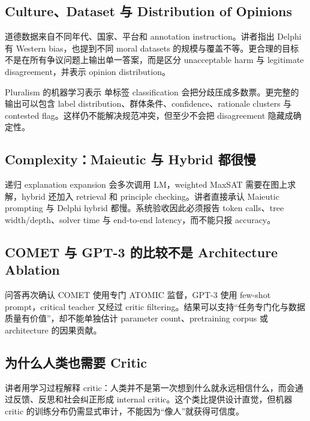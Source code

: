 \documentclass[a4paper]{article}
\begin{document}

\subsection{Culture、Dataset 与 Distribution of Opinions}

道德数据来自不同年代、国家、平台和 annotation instruction。讲者指出 Delphi 有 Western bias，也提到不同 moral datasets 的规模与覆盖不等。更合理的目标不是在所有争议问题上输出单一答案，而是区分 unacceptable harm 与 legitimate disagreement，并表示 opinion distribution。

\begin{knowledgebox}{Pluralism 的机器学习表示}
单标签 classification 会把分歧压成多数票。更完整的输出可以包含 label distribution、群体条件、confidence、rationale clusters 与 contested flag。这样仍不能解决规范冲突，但至少不会把 disagreement 隐藏成确定性。
\end{knowledgebox}

\subsection{Complexity：Maieutic 与 Hybrid 都很慢}

递归 explanation expansion 会多次调用 LM，weighted MaxSAT 需要在图上求解，hybrid 还加入 retrieval 和 principle checking。讲者直接承认 Maieutic prompting 与 Delphi hybrid 都慢。系统验收因此必须报告 token calls、tree width/depth、solver time 与 end-to-end latency，而不能只报 accuracy。

\subsection{COMET 与 GPT-3 的比较不是 Architecture Ablation}

问答再次确认 COMET 使用专门 ATOMIC 监督，GPT-3 使用 few-shot prompt，critical teacher 又经过 critic filtering。结果可以支持“任务专门化与数据质量有价值”，却不能单独估计 parameter count、pretraining corpus 或 architecture 的因果贡献。

\subsection{为什么人类也需要 Critic}

讲者用学习过程解释 critic：人类并不是第一次想到什么就永远相信什么，而会通过反馈、反思和社会纠正形成 internal critic。这个类比提供设计直觉，但机器 critic 的训练分布仍需显式审计，不能因为“像人”就获得可信度。
\end{document}

